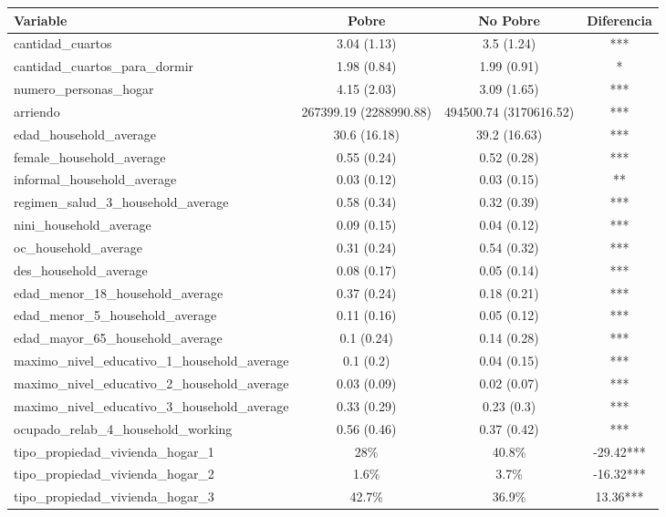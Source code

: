 \begin{table}
\centering
\begin{tabular}{l|c|c|c}
\hline
Variable & Pobre & No Pobre & Diferencia\\
\hline
cantidad\_cuartos & 3.04 (1.13) & 3.5 (1.24) & ***\\
\hline
cantidad\_cuartos\_para\_dormir & 1.98 (0.84) & 1.99 (0.91) & *\\
\hline
numero\_personas\_hogar & 4.15 (2.03) & 3.09 (1.65) & ***\\
\hline
arriendo & 267399.19 (2288990.88) & 494500.74 (3170616.52) & ***\\
\hline
edad\_household\_average & 30.6 (16.18) & 39.2 (16.63) & ***\\
\hline
female\_household\_average & 0.55 (0.24) & 0.52 (0.28) & ***\\
\hline
informal\_household\_average & 0.03 (0.12) & 0.03 (0.15) & **\\
\hline
regimen\_salud\_3\_household\_average & 0.58 (0.34) & 0.32 (0.39) & ***\\
\hline
nini\_household\_average & 0.09 (0.15) & 0.04 (0.12) & ***\\
\hline
oc\_household\_average & 0.31 (0.24) & 0.54 (0.32) & ***\\
\hline
des\_household\_average & 0.08 (0.17) & 0.05 (0.14) & ***\\
\hline
edad\_menor\_18\_household\_average & 0.37 (0.24) & 0.18 (0.21) & ***\\
\hline
edad\_menor\_5\_household\_average & 0.11 (0.16) & 0.05 (0.12) & ***\\
\hline
edad\_mayor\_65\_household\_average & 0.1 (0.24) & 0.14 (0.28) & ***\\
\hline
maximo\_nivel\_educativo\_1\_household\_average & 0.1 (0.2) & 0.04 (0.15) & ***\\
\hline
maximo\_nivel\_educativo\_2\_household\_average & 0.03 (0.09) & 0.02 (0.07) & ***\\
\hline
maximo\_nivel\_educativo\_3\_household\_average & 0.33 (0.29) & 0.23 (0.3) & ***\\
\hline
ocupado\_relab\_4\_household\_working & 0.56 (0.46) & 0.37 (0.42) & ***\\
\hline
tipo\_propiedad\_vivienda\_hogar\_1 & 28\% & 40.8\% & -29.42***\\
\hline
tipo\_propiedad\_vivienda\_hogar\_2 & 1.6\% & 3.7\% & -16.32***\\
\hline
tipo\_propiedad\_vivienda\_hogar\_3 & 42.7\% & 36.9\% & 13.36***\\

\end{tabular}
\end{table}
